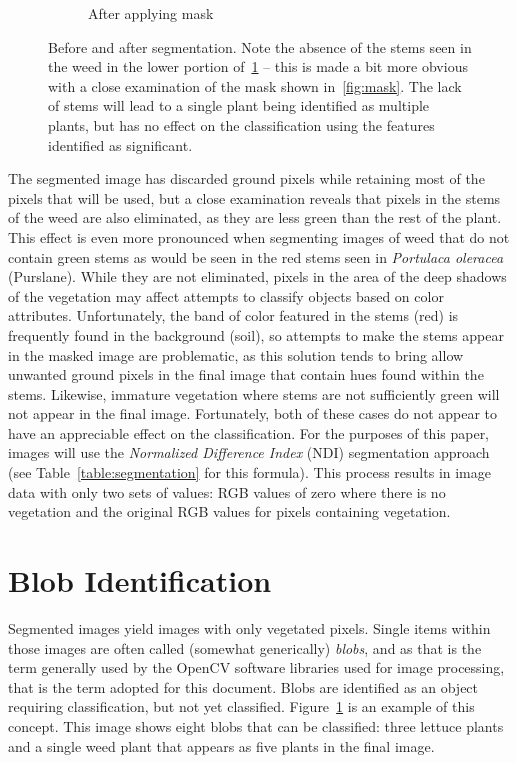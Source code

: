 \documentclass[letterpaper]{article}
\begin{document}
{{\begin{figure}[H]
\begin{subfigure}[h]{.30\textwidth}
	  \caption{After applying mask}
	  \label{fig:original-masked}
	\end{subfigure}
	\caption[Before and after segmentation]{Before and after segmentation. Note the absence of the stems seen in the weed in the lower portion of~\ref{fig:original-masked} -- this is made a bit more obvious with a close examination of the mask shown in~\ref{fig:mask}. The lack of stems will lead to a single plant being identified as multiple plants, but has no effect on the classification using the features identified as significant.}
	\label{fig:segmentation}
\end{figure}
The segmented image has discarded ground pixels while retaining most of the pixels that will be used, but a close examination reveals that pixels in the stems of the weed are also eliminated, as they are less green than the rest of the plant. This effect is even more pronounced when segmenting images of weed that do not contain green stems as would be seen in the red stems seen in \textit{Portulaca oleracea} (Purslane). While they are not eliminated, pixels in the area of the deep shadows of the vegetation may affect attempts to classify objects based on color attributes. Unfortunately, the band of color featured in the stems (red) is frequently found in the background (soil), so attempts to make the stems appear in the masked image are problematic, as this solution tends to bring allow unwanted ground pixels in the final image that contain hues found within the stems. Likewise, immature vegetation where stems are not sufficiently green will not appear in the final image. Fortunately, both of these cases do not appear to have an appreciable effect on the classification. For the purposes of this paper, images will use the \textit{Normalized Difference Index} (NDI) segmentation approach (see Table~\ref{table:segmentation} for this formula). This process results in image data with only two sets of values: RGB values of zero where there is no vegetation and the original RGB values for pixels containing vegetation.

\section{Blob Identification}
Segmented images yield images with only vegetated pixels. Single items within those images are often called (somewhat generically) \textit{blobs}, and as that is the term generally used by the OpenCV software libraries used for image processing, that is the term adopted for this document. Blobs are identified as an object requiring classification, but not yet classified. Figure~\ref{fig:original-masked} is an example of this concept. This image shows eight blobs that can be classified: three lettuce plants and a single weed plant that appears as five plants in the final image.

}}
\end{document}
